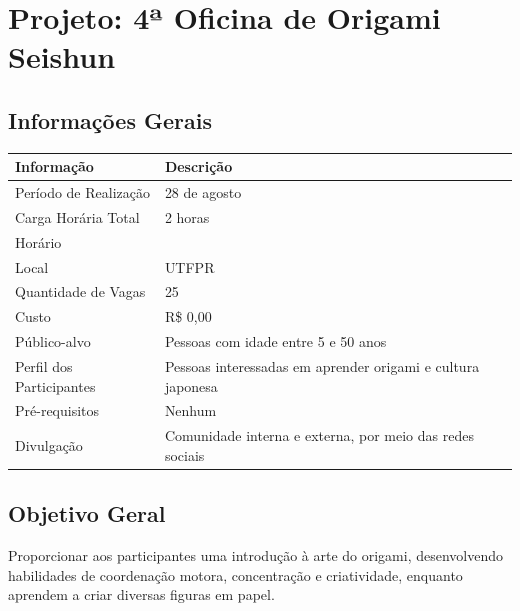 \documentclass[12pt,a4paper]{article}
\begin{document}
\section*{Projeto: 4ª Oficina de Origami Seishun}

\subsection*{Informações Gerais}

\begin{table}[H]
\centering
\begin{tabularx}{\textwidth}{|>{\raggedright\arraybackslash}p{5cm}|X|}
\hline
\textbf{Informação} & \textbf{Descrição} \\ \hline

Período de Realização &
28 de agosto \\ \hline

Carga Horária Total &
2 horas \\ \hline

Horário &
\\ \hline

Local &
UTFPR \\ \hline

Quantidade de Vagas &
25 \\ \hline

Custo &
R\$ 0,00 \\ \hline

Público-alvo &
Pessoas com idade entre 5 e 50 anos \\ \hline

Perfil dos Participantes &
Pessoas interessadas em aprender origami e cultura japonesa \\ \hline

Pré-requisitos &
Nenhum \\ \hline

Divulgação &
Comunidade interna e externa, por meio das redes sociais \\ \hline

\end{tabularx}
\end{table}

\subsection*{Objetivo Geral}

Proporcionar aos participantes uma introdução à arte do origami, desenvolvendo
habilidades de coordenação motora, concentração e criatividade, enquanto
aprendem a criar diversas figuras em papel.
\end{document}
